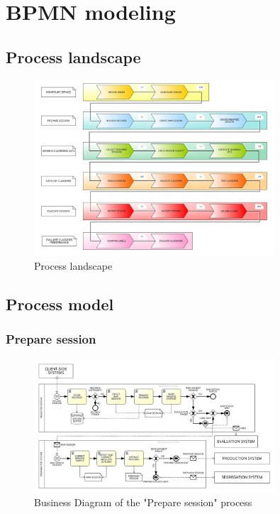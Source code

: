 \section{BPMN modeling}
\label{sec:bpmn_modeling}

\subsection{Process landscape}
\label{sec:bpmn_process_landscape}

\begin{figure}[H]
\centering
\includegraphics[width=0.8\textwidth]{figures/PROCESS LANDSCAPE.png}
\caption{Process landscape}
\label{fig:bpmn_process_landscape}
\end{figure}

\subsection{Process model}

\subsubsection{Prepare session}
\label{sec:bpmn_prepare_session}

\begin{figure}[H]
\centering
\includegraphics[width=0.8\textwidth]{figures/Business Diagram - Prepare Session.png}
\caption{Business Diagram of the "Prepare session" process}
\label{fig:bpmn_prepare_session}
\end{figure}

